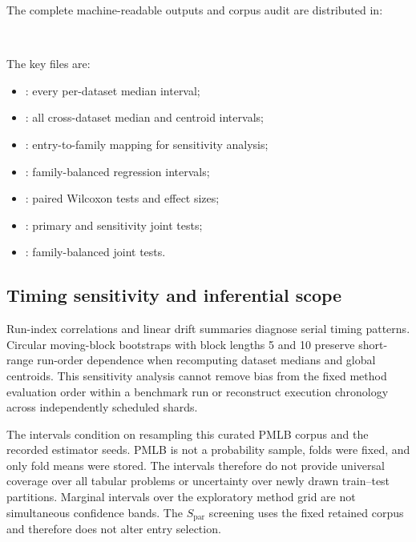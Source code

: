 \documentclass[final,5p,times,twocolumn]{elsarticle}
\begin{document}
The complete machine-readable outputs and corpus audit are distributed in:
\begin{center}
\footnotesize
{}\\[-2pt]
\end{center}
\noindent The key files are:
\begin{itemize}
\small
\setlength{\itemsep}{0pt}
\setlength{\parskip}{0pt}
\item {}: every per-dataset median interval;
\item {}: all cross-dataset median and centroid intervals;
\item {}: entry-to-family mapping for sensitivity analysis;
\item {}: family-balanced regression intervals;
\item {}: paired Wilcoxon tests and effect sizes;
\item {}: primary and sensitivity joint tests;
\item {}: family-balanced joint tests.
\end{itemize}

\subsection{Timing sensitivity and inferential scope}

Run-index correlations and linear drift summaries diagnose serial timing
patterns.  Circular moving-block bootstraps with block lengths 5 and 10 preserve
short-range run-order dependence when recomputing dataset medians and global
centroids.  This sensitivity analysis cannot remove bias from the fixed method
evaluation order within a benchmark run or reconstruct execution chronology
across independently scheduled shards.

The intervals condition on resampling this curated PMLB corpus and the recorded
estimator seeds.  PMLB is not a probability sample, folds were fixed, and only
fold means were stored.  The intervals therefore do not provide universal
coverage over all tabular problems or uncertainty over newly drawn train--test
partitions.  Marginal intervals over the exploratory method grid are not
simultaneous confidence bands.  The \(S_{\mathrm{par}}\) screening uses the
fixed retained corpus and therefore does not alter entry selection.
\end{document}
